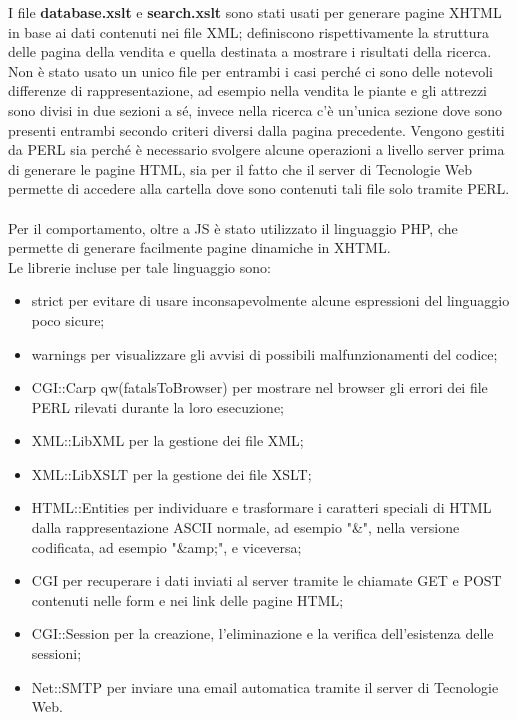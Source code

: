 {	I file \textbf{database.xslt} e \textbf{search.xslt} sono stati usati per generare pagine XHTML in base ai dati contenuti nei file XML; definiscono rispettivamente la struttura delle pagina della vendita e quella destinata a mostrare i risultati della ricerca. Non è stato usato un unico file per entrambi i casi perché ci sono delle notevoli differenze di rappresentazione, ad esempio nella vendita le piante e gli attrezzi sono divisi in due sezioni a sé, invece nella ricerca c'è un'unica sezione dove sono presenti entrambi secondo criteri diversi dalla pagina precedente.
	Vengono gestiti da PERL sia perché è necessario svolgere alcune operazioni a livello server prima di generare le pagine HTML, sia per il fatto che il server di Tecnologie Web permette di accedere alla cartella dove sono contenuti tali file solo tramite PERL.\\
	\\
	Per il comportamento, oltre a JS è stato utilizzato il linguaggio PHP, che permette di generare facilmente pagine dinamiche in XHTML.\\ 
	Le librerie incluse per tale linguaggio sono:
	\begin{itemize}\itemsep1pt
		\item strict per evitare di usare inconsapevolmente alcune espressioni del linguaggio poco sicure;
		\item warnings per visualizzare gli avvisi di possibili malfunzionamenti del codice;
		\item CGI::Carp qw(fatalsToBrowser) per mostrare nel browser gli errori dei file PERL rilevati durante la loro esecuzione;
		\item XML::LibXML per la gestione dei file XML;
		\item XML::LibXSLT per la gestione dei file XSLT;
		\item HTML::Entities per individuare e trasformare i caratteri speciali di HTML dalla rappresentazione ASCII normale, ad esempio "\&", nella versione codificata, ad esempio "\&amp;", e viceversa;
		\item CGI per recuperare i dati inviati al server tramite le chiamate GET e POST contenuti nelle form e nei link delle pagine HTML;
		\item CGI::Session per la creazione, l'eliminazione e la verifica dell'esistenza delle sessioni;
		\item Net::SMTP per inviare una email automatica tramite il server di Tecnologie Web.
	 \end{itemize}
}